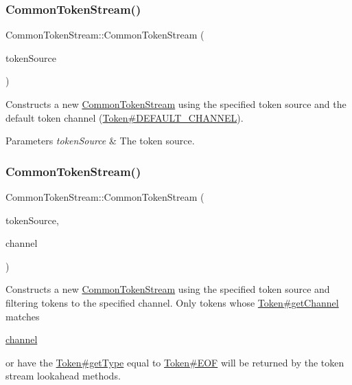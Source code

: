 \subsubsection{\texorpdfstring{Common\+Token\+Stream()}{CommonTokenStream()}\hspace{0.1cm}{\footnotesize\ttfamily [1/2]}}
{\footnotesize\ttfamily Common\+Token\+Stream\+::\+Common\+Token\+Stream (\begin{DoxyParamCaption}\item[{\hyperlink{classantlr4_1_1TokenSource}{Token\+Source} $\ast$}]{token\+Source }\end{DoxyParamCaption})}

Constructs a new \hyperlink{classantlr4_1_1CommonTokenStream}{Common\+Token\+Stream} using the specified token source and the default token channel (\hyperlink{classantlr4_1_1Token_a699cbc56affbddc079561e175cba8435}{Token\#\+D\+E\+F\+A\+U\+L\+T\+\_\+\+C\+H\+A\+N\+N\+EL}).


\begin{DoxyParams}{Parameters}
{\em token\+Source} & The token source. \\
\hline
\end{DoxyParams}
\mbox{\label{classantlr4_1_1CommonTokenStream_a3565e4d1910fb5e13b49d6a1f12e5cd7}} 
\subsubsection{\texorpdfstring{Common\+Token\+Stream()}{CommonTokenStream()}\hspace{0.1cm}{\footnotesize\ttfamily [2/2]}}
{\footnotesize\ttfamily Common\+Token\+Stream\+::\+Common\+Token\+Stream (\begin{DoxyParamCaption}\item[{\hyperlink{classantlr4_1_1TokenSource}{Token\+Source} $\ast$}]{token\+Source,  }\item[{size\+\_\+t}]{channel }\end{DoxyParamCaption})}

Constructs a new \hyperlink{classantlr4_1_1CommonTokenStream}{Common\+Token\+Stream} using the specified token source and filtering tokens to the specified channel. Only tokens whose \hyperlink{classantlr4_1_1Token_a92991c0566e4cb00ae2c5f9e7d8fe6b4}{Token\#get\+Channel} matches
\begin{DoxyCode}
\hyperlink{classantlr4_1_1CommonTokenStream_aad59d04a125961d8ba1cffdf4a1a0bcf}{channel} 
\end{DoxyCode}
 or have the \hyperlink{classantlr4_1_1Token_a518342431db9dd9d982880a59ef0e4f4}{Token\#get\+Type} equal to \hyperlink{}{Token\#\+E\+OF} will be returned by the token stream lookahead methods.


